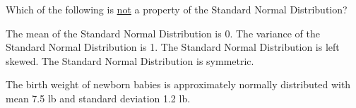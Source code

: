 \documentclass[noanswers]{exam}
\begin{document}
\begin{questions}
\begin{parts}
\vspace{3mm}

\begin{choices}
\end{choices}

\end{parts}

\newpage

\question Which of the following is \underline{not} a property of the Standard Normal Distribution?

\vspace{3mm}

\begin{choices}
\choice The mean of the Standard Normal Distribution is 0.
\choice The variance of the Standard Normal Distribution is 1.
\CorrectChoice The Standard Normal Distribution is left skewed.
\choice The Standard Normal Distribution is symmetric.
\end{choices}

\vspace{3mm}

\question The birth weight of newborn babies is approximately normally distributed with mean 7.5 lb and standard deviation 1.2 lb.

\vspace{3mm}

\end{questions}
\end{document}

